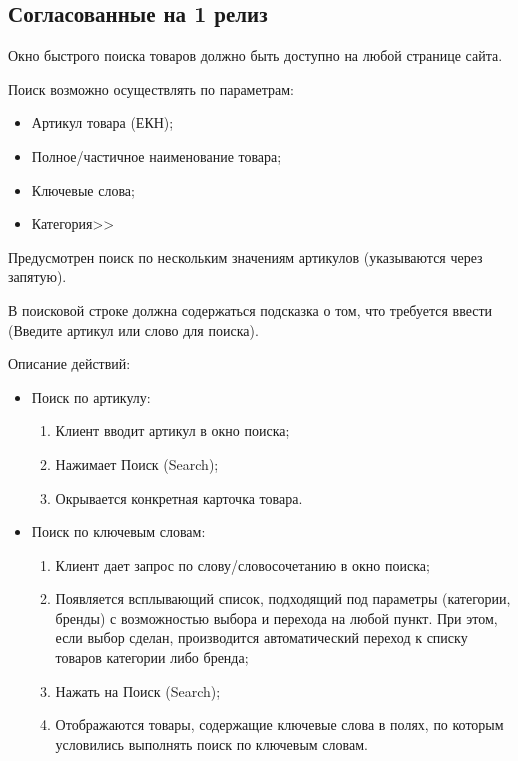 \subsection{Согласованные на 1 релиз}
\fi
{}
{


\begin{wikilong}
	Окно быстрого поиска товаров должно быть доступно на любой странице сайта.
	
	Поиск возможно осуществлять по параметрам:
	\begin{itemize}
		\item Артикул товара (ЕКН);
		\item Полное/частичное наименование товара;
		\item Ключевые слова;
		\item Категория>>
	\end{itemize}
	
	Предусмотрен поиск по нескольким значениям артикулов (указываются через запятую).
	
	В поисковой строке должна содержаться подсказка о том, что требуется ввести (Введите артикул или слово для поиска).
	
	Описание действий:
	\begin{itemize}
	
		\item Поиск по артикулу:
			\begin{enumerate} 
				\item Клиент вводит артикул в окно поиска;
				\item Нажимает Поиск (Search);
				\item Окрывается конкретная карточка товара.
			\end{enumerate}	
			
		\item Поиск по ключевым словам:
		 	\begin{enumerate} 
			 	\item Клиент дает запрос по слову/словосочетанию в окно поиска;
				\item Появляется всплывающий список, подходящий под параметры (категории, бренды) с возможностью выбора и перехода на любой пункт. При этом, если выбор сделан, производится автоматический переход к списку товаров категории либо бренда;
				\item Нажать на Поиск (Search);
				\item Отображаются товары, содержащие ключевые слова в полях, по которым условились выполнять поиск по ключевым словам.
			\end{enumerate}
			

\end{itemize}
\end{wikilong}}
